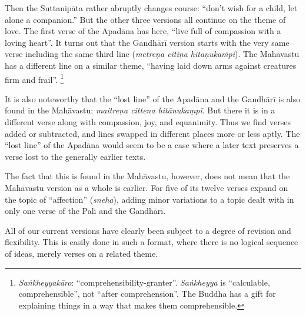 \documentclass[12pt,openany]{book}%
\begin{document}
Then the \textsanskrit{Suttanipāta} rather abruptly changes course: “don’t wish for a child, let alone a companion.” But the other three versions all continue on the theme of love. The first verse of the \textsanskrit{Apadāna} has here, “live full of compassion with a loving heart”. It turns out that the \textsanskrit{Gandhārī} version starts with the very same verse including the same third line (\textit{\textsanskrit{metreṇa} \textsanskrit{citiṇa} \textsanskrit{hitaṇ}‍\textsanskrit{ukaṁpi}}). The \textsanskrit{Mahāvastu} has a different line on a similar theme, “having laid down arms against creatures firm and frail”. \footnote{\textit{\textsanskrit{Saṅkheyyakāro}}: “comprehensibility-granter”. \textit{\textsanskrit{Saṅkheyya}} is “calculable, comprehensible”, not “after comprehension”. The Buddha has a gift for explaining things in a way that makes them comprehensible. }

It is also noteworthy that the “lost line” of the \textsanskrit{Apadāna} and the \textsanskrit{Gandhārī} is also found in the \textsanskrit{Mahāvastu}: \textit{\textsanskrit{maitreṇa} cittena \textsanskrit{hitānukaṃpī}}. But there it is in a different verse along with compassion, joy, and equanimity. Thus we find verses added or subtracted, and lines swapped in different places more or less aptly. The “lost line” of the \textsanskrit{Apadāna} would seem to be a case where a later text preserves a verse lost to the generally earlier texts.

The fact that this is found in the \textsanskrit{Mahāvastu}, however, does not mean that the \textsanskrit{Mahāvastu} version as a whole is earlier. For five of its twelve verses expand on the topic of “affection” (\textit{sneha}), adding minor variations to a topic dealt with in only one verse of the Pali and the \textsanskrit{Gandhārī}.

All of our current versions have clearly been subject to a degree of revision and flexibility. This is easily done in such a format, where there is no logical sequence of ideas, merely verses on a related theme.
\end{document}
